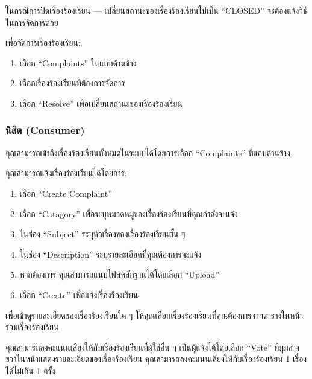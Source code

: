 ในกรณีการปิดเรื่องร้องเรียน --- เปลี่ยนสถานะของเรื่องร้องเรียนไปเป็น ``CLOSED'' จะต้องแจ้งวิธีในการจัดการด้วย

เพื่อจัดการเรื่องร้องเรียน:

\begin{enumerate}
    \item เลือก  ``Complaints'' ในแถบด้านข้าง
    \item เลือกเรื่องร้องเรียนที่ต้องการจัดการ
    \item เลือก ``Resolve'' เพื่อเปลี่ยนสถานะของเรื่องร้องเรียน
\end{enumerate}

\pagebreak[4]

\subsubsection{นิสิต (Consumer)}\label{subsubsec:role-usage-consumer}


คุณสามารถเข้าถึงเรื่องร้องเรียนทั้งหมดในระบบได้โดยการเลือก ``Complaints'' ที่แถบด้านข้าง

\pagebreak[3]


คุณสามารถแจ้งเรื่องร้องเรียนได้โดยการ:

\begin{enumerate}
    \item เลือก ``Create Complaint''
    \item เลือก ``Catagory'' เพื่อระบุหมวดหมู่ของเรื่องร้องเรียนที่คุณกำลังจะแจ้ง
    \item ในช่อง ``Subject'' ระบุหัวเรื่องของเรื่องร้องเรียนสั้น ๆ
    \item ในช่อง ``Description'' ระบุรายละเอียดที่คุณต้องการจะแจ้ง
    \item หากต้องการ คุณสามารถแนบไฟล์หลักฐานได้โดยเลือก ``Upload''
    \item เลือก ``Create'' เพื่อแจ้งเรื่องร้องเรียน
\end{enumerate}

\pagebreak[3]


เพื่อเข้าดูรายละเอียดของเรื่องร้องเรียนใด ๆ ให้คุณเลือกเรื่องร้องเรียนที่คุณต้องการจากตารางในหน้ารวมเรื่องร้องเรียน

\pagebreak[3]


คุณสามารถลงคะแนนเสียงให้กับเรื่องร้องเรียนที่ผู้ใช้อื่น ๆ เป็นผู้แจ้งได้โดยเลือก ``Vote''
ที่มุมล่างขวาในหน้าแสดงรายละเอียดของเรื่องร้องเรียน
คุณสามารถลงคะแนนเสียงให้กับเรื่องร้องเรียน 1 เรื่องได้ไม่เกิน 1 ครั้ง

\pagebreak[4]
